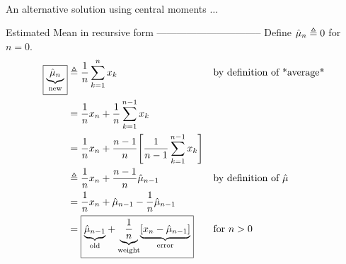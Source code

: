 $\newcommand{\ds}{\displaystyle}$
$\newcommand{\mean}{\mu}$
$\newcommand{\meanest}{\hat{\mean}}$
$\newcommand{\seqn}[1]{\left\{#1\right\}}$
$\newcommand{\rvx}{x}$
$\newcommand{\xN}{N}$
$\newcommand{\eqd}{\triangleq}$
$\newcommand{\brp}[1]{{\left(#1\right)}}$
$\newcommand{\brs}[1]{{\left[#1\right]}}$
$\newcommand{\brl}[1]{{\left.#1\right|}}$
$\newcommand{\moment}{M}$
$\newcommand{\momest}{\hat{\moment}}$
$\newcommand{\meanest}{\hat{\mean}}$
$\newcommand{\cmomest}{\hat{\cmom}}$
$\newcommand{\varest}{\hat{\var}}$
$\newcommand{\popvarest}{\hat{\popvar}}$
$\newcommand{\mcom}[2]{{\displaystyle\underbrace{\displaystyle#1}_{\text{#2}}}}$
$\newcommand{\indentx}{\ensuremath{\mbox{}\qquad}}$

An alternative solution using central moments $\ldots$

Estimated Mean in recursive form
--------------------------------
Define $\meanest_{n}\eqd 0$ for $n=0$.
\begin{align*}
  \boxed{\mcom{\meanest_{n}}{new}}
    &\eqd \frac{1}{n} \sum_{k=1}^{n} \rvx_k
    && \text{by definition of *average*}
  \\&= \frac{1}{n}\rvx_n + \frac{1}{n} \sum_{k=1}^{n-1} \rvx_k
  \\&= \frac{1}{n}\rvx_n + \frac{n-1}{n}\brs{\frac{1}{n-1} \sum_{k=1}^{n-1} \rvx_k }
  \\&\eqd \frac{1}{n}\rvx_n + \frac{n-1}{n}\meanest_{n-1}
    && \text{by definition of $\meanest$}
  \\&= \frac{1}{n}\rvx_n + \meanest_{n-1} - \frac{1}{n}\meanest_{n-1}
  \\&= \boxed{\mcom{\meanest_{n-1}}{old} + \mcom{\frac{1}{n}}{weight} \mcom{\brs{\rvx_n - \meanest_{n-1}}}{error}}
    && \text{for $n>0$}
\end{align*}

